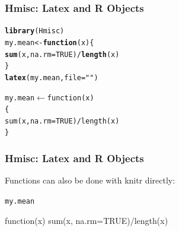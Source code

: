 \documentclass{beamer}\usepackage[]{graphicx}\usepackage[]{color}
\makeatletter
\newcommand{\hlnum}[1]{\textcolor[rgb]{0.686,0.059,0.569}{#1}}%
\newcommand{\hlstr}[1]{\textcolor[rgb]{0.192,0.494,0.8}{#1}}%
\newcommand{\hlopt}[1]{\textcolor[rgb]{0,0,0}{#1}}%
\newcommand{\hlstd}[1]{\textcolor[rgb]{0.345,0.345,0.345}{#1}}%
\newcommand{\hlkwa}[1]{\textcolor[rgb]{0.161,0.373,0.58}{\textbf{#1}}}%
\newcommand{\hlkwb}[1]{\textcolor[rgb]{0.69,0.353,0.396}{#1}}%
\newcommand{\hlkwc}[1]{\textcolor[rgb]{0.333,0.667,0.333}{#1}}%
\newcommand{\hlkwd}[1]{\textcolor[rgb]{0.737,0.353,0.396}{\textbf{#1}}}%
\newenvironment{kframe}{%
 \def\at@end@of@kframe{}%
 \ifinner\ifhmode%
  \def\at@end@of@kframe{\end{minipage}}%
  \begin{minipage}{\columnwidth}%
 \fi\fi%
 \def\FrameCommand##1{\hskip\@totalleftmargin \hskip-\fboxsep
 \colorbox{shadecolor}{##1}\hskip-\fboxsep
     \hskip-\linewidth \hskip-\@totalleftmargin \hskip\columnwidth}%
 \MakeFramed {\advance\hsize-\width
   \@totalleftmargin\z@ \linewidth\hsize
   \@setminipage}}%
 {\par\unskip\endMakeFramed%
 \at@end@of@kframe}
\makeatother
\begin{document}

\begin{frame}[fragile]
\frametitle{Hmisc: Latex and R Objects}
\begin{kframe}
\begin{alltt}
\hlkwd{library}\hlstd{(Hmisc)}
\hlstd{my.mean} \hlkwb{<-} \hlkwa{function}\hlstd{(}\hlkwc{x}\hlstd{)\{}
  \hlkwd{sum}\hlstd{(x,} \hlkwc{na.rm}\hlstd{=}\hlnum{TRUE}\hlstd{)}\hlopt{/}\hlkwd{length}\hlstd{(x)}
\hlstd{\}}
\hlkwd{latex}\hlstd{(my.mean,} \hlkwc{file}\hlstd{=}\hlstr{""}\hlstd{)}
\end{alltt}
\end{kframe}\begin{alltt}
my.mean \(\leftarrow\) function (x) 
\{
    sum(x, na.rm = TRUE)/length(x)
\}
\end{alltt}



\end{frame}


\begin{frame}[fragile]
\frametitle{Hmisc: Latex and R Objects}
Functions can also be done with knitr directly: 
\begin{kframe}
\begin{alltt}
\hlstd{my.mean}
\end{alltt}
\end{kframe}function(x){
  sum(x, na.rm=TRUE)/length(x)
}



\end{frame}

\end{document}
